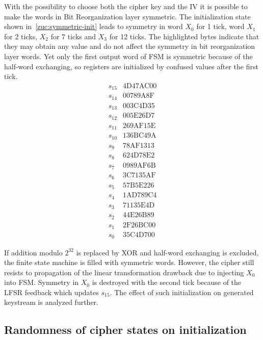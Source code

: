 With the possibility to choose both the cipher key and the IV it is possible to
make the words in Bit Reorganization layer symmetric. The initialization state
shown in~\eqref{zuc:symmetric-init} leads to symmetry in word $X_0$ for 1 tick, word $X_1$
for 2 ticks, $X_2$ for 7 ticks and $X_3$ for 12 ticks. The highlighted bytes indicate
that they may obtain any value and do not affect the symmetry in bit
reorganization layer words. Yet only the first output word of FSM is symmetric
because of the half-word exchanging, so registers are initialized by confused
values after the first tick. 
\begin{equation}
    \label{zuc:symmetric-init}
    \begin{array}{ll}
        s_{15} & \text{4D47AC00}\\
        s_{14} & \text{00789A8F}\\
        s_{13} & \text{003C4D35}\\
        s_{12} & \text{005E26D7}\\
        s_{11} & \text{269AF15E}\\
        s_{10} & \text{136BC49A}\\
        s_{9}  & \text{78AF1313}\\
        s_{8}  & \text{624D78E2}\\
        s_{7}  & \text{0989AF6B}\\
        s_{6}  & \text{3C7135AF}\\
        s_{5}  & \text{57B5E226}\\
        s_{4}  & \text{1AD789C4}\\
        s_{3}  & \text{71135E4D}\\
        s_{2}  & \text{44E26B89}\\
        s_{1}  & \text{2F26BC00}\\
        s_{0}  & \text{35C4D700}
    \end{array}
\end{equation}

If addition modulo $2^{32}$ is replaced by XOR and half-word exchanging is excluded,
the finite state machine is filled with symmetric words. However, the cipher
still resists to propagation of the linear transformation drawback due to
injecting $X_0$ into FSM. Symmetry in $X_0$ is destroyed with the second tick because of
the LFSR feedback which updates $s_{15}$. The effect of such initialization on
generated keystream is analyzed further.

\subsection{Randomness of cipher states on initialization}

